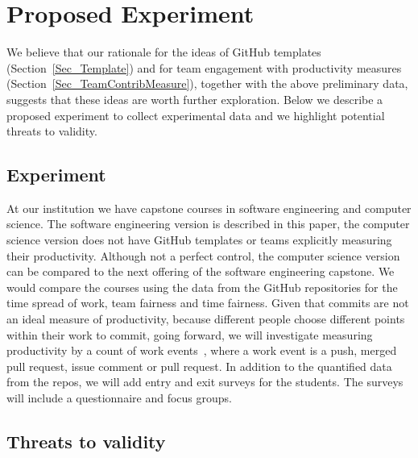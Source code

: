 \documentclass[10pt, conference]{IEEEtran}
\begin{document}
\section{Proposed Experiment} \label{SecProposedExperiment}

We believe that our rationale for the ideas of GitHub templates
(Section~\ref{Sec_Template}) and for team engagement with productivity measures
(Section~\ref{Sec_TeamContribMeasure}), together with the above preliminary
data, suggests that these ideas are worth further exploration.  Below we
describe a proposed experiment to collect experimental data and we highlight
potential threats to validity.

\subsection{Experiment}

At our institution we have capstone courses in software engineering and computer
science. The software engineering version is described in this paper, the
computer science version does not have GitHub templates or teams explicitly
measuring their productivity.  Although not a perfect control, the computer
science version can be compared to the next offering of the software engineering
capstone.  We would compare the courses using the data from the GitHub
repositories for the time spread of work, team fairness and time fairness.
Given that commits are not an ideal measure of productivity, because different
people choose different points within their work to commit, going forward, we
will investigate measuring productivity by a count of work
events~\cite{saadatAnalyzingProductivityGitHub2020}, where a work event is a
push, merged pull request, issue comment or pull request.  In addition to the
quantified data from the repos, we will add entry and exit surveys for the
students. The surveys will include a questionnaire and focus groups.

\subsection{Threats to validity}
\end{document}
